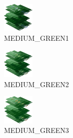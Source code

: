 \hspace{0.1cm}
\begin{minipage}[b]{0.15\linewidth}
\begin{figure}[H]                                                          
  \centering                                                             
  \begin{adjustbox}{width=1.5cm,center}                                   
  \includegraphics[width=1.5cm]{src/colorspace_colourflow/flows/colourflow_193-45.png}%
  \end{adjustbox}                                                        
\caption*{MEDIUM\_GREEN1}                                           
\end{figure}                                                               
\end{minipage}
\hspace{0.1cm}
\begin{minipage}[b]{0.15\linewidth}
\begin{figure}[H]                                                          
  \centering                                                             
  \begin{adjustbox}{width=1.5cm,center}                                   
  \includegraphics[width=1.5cm]{src/colorspace_colourflow/flows/colourflow_194-45.png}%
  \end{adjustbox}                                                        
\caption*{MEDIUM\_GREEN2}                                           
\end{figure}                                                               
\end{minipage}
\hspace{0.1cm}
\begin{minipage}[b]{0.15\linewidth}
\begin{figure}[H]                                                          
  \centering                                                             
  \begin{adjustbox}{width=1.5cm,center}                                   
  \includegraphics[width=1.5cm]{src/colorspace_colourflow/flows/colourflow_195-45.png}%
  \end{adjustbox}                                                        
\caption*{MEDIUM\_GREEN3}                                           
\end{figure}                                                               
\end{minipage}
